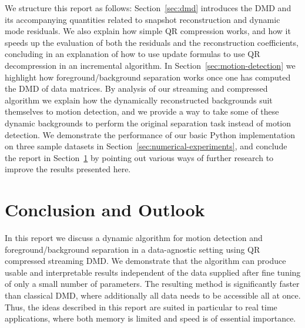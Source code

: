 \documentclass{article}
\begin{document}
    We structure this report as follows: Section~\ref{sec:dmd} introduces the DMD and its accompanying quantities related to snapshot reconstruction and dynamic mode residuals. We also explain how simple QR compression works, and how it speeds up the evaluation of both the residuals and the reconstruction coefficients, concluding in an explanation of how to use update formulas to use QR decompression in an incremental algorithm. In Section~\ref{sec:motion-detection} we highlight how foreground/background separation works once one has computed the DMD of data matrices. By analysis of our streaming and compressed algorithm we explain how the dynamically reconstructed backgrounds suit themselves to motion detection, and we provide a way to take some of these dynamic backgrounds to perform the original separation task instead of motion detection. We demonstrate the performance of our basic Python implementation on three sample datasets in Section~\ref{sec:numerical-experiments}, and conclude the report in Section~\ref{sec:conclusion} by pointing out various ways of further research to improve the results presented here.
    
    
    
    

    \section{Conclusion and Outlook}\label{sec:conclusion}

    In this report we discuss a dynamic algorithm for motion detection and foreground/background separation in a data-agnostic setting using QR compressed streaming DMD. We demonstrate that the algorithm can produce usable and interpretable results independent of the data supplied after fine tuning of only a small number of parameters. The resulting method is significantly faster than classical DMD, where additionally all data needs to be accessible all at once. Thus, the ideas described in this report are suited in particular to real time applications, where both memory is limited and speed is of essential importance.
\end{document}
